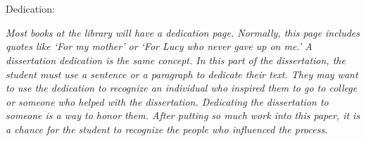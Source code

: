 \chapter*{\phantom{Dedication}}

Dedication:

\hfil \textit{Most books at the library will have a dedication page. Normally, this page includes quotes like `For my mother' or `For Lucy who never gave up on me.' A dissertation dedication is the same concept. In this part of the dissertation, the student must use a sentence or a paragraph to dedicate their text. They may want to use the dedication to recognize an individual who inspired them to go to college or someone who helped with the dissertation. Dedicating the dissertation to someone is a way to honor them. After putting so much work into this paper, it is a chance for the student to recognize the people who influenced the process.} \hfil
